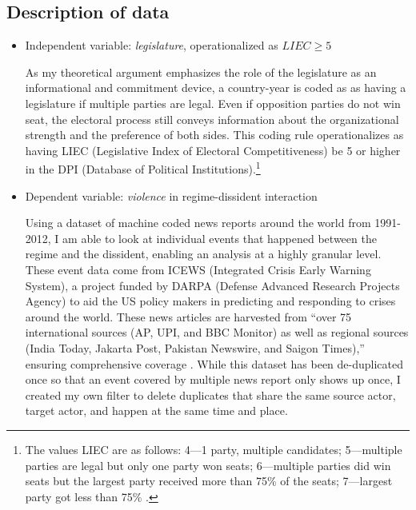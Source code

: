 \subsection{Description of data}

\begin{itemize}

\item Independent variable: \textit{legislature}, operationalized as $LIEC \geq 5$ 

As my theoretical argument emphasizes the role of the legislature as an informational and commitment device, a country-year is coded as as having a legislature if multiple parties are legal. Even if opposition parties do not win seat, the electoral process still conveys information about the organizational strength and the preference of both sides. This coding rule operationalizes as having LIEC (Legislative Index of Electoral Competitiveness) be 5 or higher in the DPI (Database of Political Institutions).\footnote{The values LIEC are as follows: 4---1 party, multiple candidates; 5---multiple parties are legal but only one party won seats; 6---multiple parties did win seats but the largest party received more than 75\% of the seats; 7---largest party got less than 75\% \citep[14]{Keefer2002}.}

\item Dependent variable: \textit{violence} in regime-dissident interaction

Using a dataset of machine coded news reports around the world from 1991-2012, I am able to look at individual events that happened between the regime and the dissident, enabling an analysis at a highly granular level. These event data come from ICEWS (Integrated Crisis Early Warning System), a project funded by DARPA (Defense Advanced Research Projects Agency) to aid the US policy makers in predicting and responding to crises around the world. These news articles are harvested from ``over 75 international sources (AP, UPI, and BBC Monitor) as well as regional sources (India Today, Jakarta Post, Pakistan Newswire, and Saigon Times),'' ensuring comprehensive coverage \citep[94]{OBrien2010, OBrien2013}. While this dataset has been de-duplicated once so that an event covered by multiple news report only shows up once, I created my own filter to delete duplicates that share the same source actor, target actor, and happen at the same time and place.


\end{itemize}
